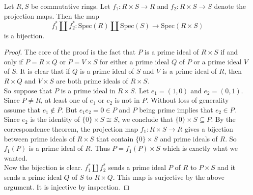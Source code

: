\documentclass[a4paper]{article}
\begin{document}
\begin{lmm}{}{} Let $R,S$ be commutative rings. Let $f_1:R\times S\to R$ and $f_2:R\times S\to S$ denote the projection maps. Then the map $$f_1^\ast\amalg f_2^\ast:\text{Spec}(R)\amalg\text{Spec}(S)\to\text{Spec}(R\times S)$$ is a bijection. 
\begin{proof}
The core of the proof is the fact that $P$ is a prime ideal of $R\times S$ if and only if $P=R\times Q$ or $P=V\times S$ for either a prime ideal $Q$ of $P$ or a prime ideal $V$ of $S$. It is clear that if $Q$ is a prime ideal of $S$ and $V$ is a prime ideal of $R$, then $R\times Q$ and $V\times S$ are both prime ideals of $R\times S$. \\

So suppose that $P$ is a prime ideal in $R\times S$. Let $e_1=(1,0)$ and $e_2=(0,1)$. Since $P\neq R$, at least one of $e_1$ or $e_2$ is not in $P$. Without loss of generality assume that $e_1\notin P$. But $e_1e_2=0\in P$ and $P$ being prime implies that $e_2\in P$. Since $e_2$ is the identity of $\{0\}\times S\cong S$, we conclude that $\{0\}\times S\subseteq P$. By the correspondence theorem, the projection map $f_1:R\times S\to R$ gives a bijection between prime ideals of $R\times S$ that contain $\{0\}\times S$ and prime ideals of $R$. So $f_1(P)$ is a prime ideal of $R$. Thus $P=f_1(P)\times S$ which is exactly what we wanted. \\

Now the bijection is clear. $f_1^\ast\amalg f_2^\ast$ sends a prime ideal $P$ of $R$ to $P\times S$ and it sends a prime ideal $Q$ of $S$ to $R\times Q$. This map is surjective by the above argument. It is injective by inspection. 
\end{proof}
\end{lmm}
\end{document}
